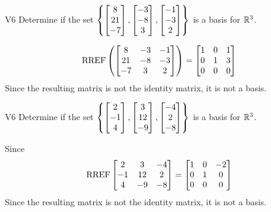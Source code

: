 \begin{problem}{V6}
Determine if the set
\(\left\{
  \begin{bmatrix} 8 \\ 21 \\ -7 \end{bmatrix},
  \begin{bmatrix} -3 \\ -8 \\ 3 \end{bmatrix},
  \begin{bmatrix} -1 \\ -3 \\ 2 \end{bmatrix}
\right\}\) is a basis for \(\mathbb{R}^3\).
\end{problem}
\begin{solution}
\[\operatorname{RREF}\left(\begin{bmatrix} 8 & -3 & -1  \\ 21 & -8 & -3  \\ -7 & 3 & 2  \end{bmatrix} \right) = \begin{bmatrix} 1 & 0 & 1  \\ 0 & 1 & 3  \\ 0 & 0 & 0 \end{bmatrix}\]
Since the resulting matrix is not the identity matrix, it is not a basis.
\end{solution}

\begin{problem}{V6}
Determine if the set
\(
  \left\{
    \begin{bmatrix} 2 \\ -1 \\ 4 \end{bmatrix},
    \begin{bmatrix} 3 \\ 12 \\ -9 \end{bmatrix},
    \begin{bmatrix} -4 \\ 2 \\ -8 \end{bmatrix}
  \right\}
\) is a basis for \(\mathbb{R}^3\).
\end{problem}
\begin{solution}
Since
\[
  \operatorname{RREF}\begin{bmatrix}
    2 & 3 &  -4 \\
    -1 & 12 &  2 \\
    4 & -9 &  -8
  \end{bmatrix} =
  \begin{bmatrix}
    1 & 0 & -2 \\
    0 & 1 & 0 \\
    0 & 0 & 0
  \end{bmatrix}
\]
Since the resulting matrix is not the identity matrix, it is not a basis.
\end{solution}


